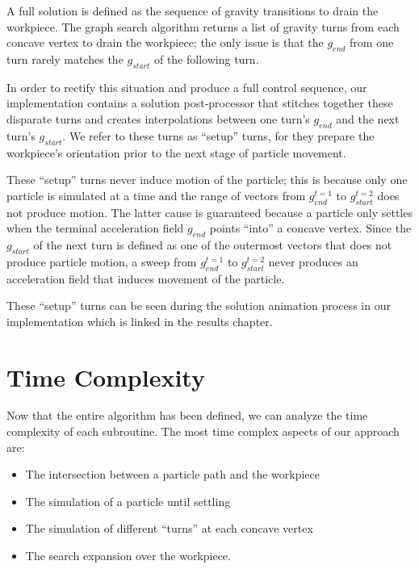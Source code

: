 A full solution is defined as the sequence of gravity transitions to drain the workpiece. The graph search algorithm returns a list of gravity turns from each concave vertex to drain the workpiece; the only issue is that the $g_{end}$ from one turn rarely matches the $g_{start}$ of the following turn.

In order to rectify this situation and produce a full control sequence, our implementation contains a solution post-processor that stitches together these disparate turns and creates interpolations between one turn's $g_{end}$ and the next turn's $g_{start}$. We refer to these turns as ``setup'' turns, for they prepare the workpiece's orientation prior to the next stage of particle movement.

These ``setup'' turns never induce motion of the particle; this is because only one particle is simulated at a time and the range of vectors from $g_{end}^{t=1}$ to $g_{start}^{t=2}$ does not produce motion. The latter cause is guaranteed because a particle only settles when the terminal acceleration field $g_{end}$ points ``into'' a concave vertex. Since the $g_{start}$ of the next turn is defined as one of the outermost vectors that does not produce particle motion, a sweep from $g_{end}^{t=1}$ to $g_{start}^{t=2}$ never produces an acceleration field that induces movement of the particle.


These ``setup'' turns can be seen during the solution animation process in our implementation which is linked in the results chapter.


  \section{Time Complexity}

Now that the entire algorithm has been defined, we can analyze the time complexity of each subroutine. The most time complex aspects of our approach are:

\begin{itemize}
\item The intersection between a particle path and the workpiece
\item The simulation of a particle until settling
\item The simulation of different ``turns'' at each concave vertex
\item The search expansion over the workpiece.
\end{itemize}

